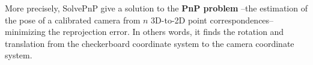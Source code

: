 More precisely, SolvePnP give a solution to the \textbf{PnP problem} --the estimation of the pose of a calibrated camera from $n$ 3D-to-2D point correspondences-- minimizing the reprojection error. In others words, it finds the rotation and translation from the checkerboard coordinate system to the camera coordinate system.



%
%
%
%




